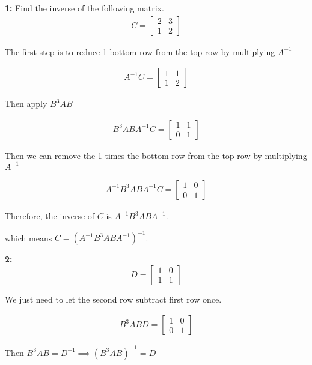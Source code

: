 \documentclass[11pt]{article}
\newenvironment{exercise}[1]
	{\noindent \textbf{#1:}}
	{\par \vspace{0.5\baselineskip}}
\begin{document}
\begin{exercise}{1}
	Find the inverse of the following matrix.
	\begin{align*}
		C = \begin{bmatrix}
			    2 & 3 \\
			    1 & 2
		    \end{bmatrix}
	\end{align*}

	The first step is to reduce 1 bottom row from the top row by multiplying \(A^{-1}\)
	
	\begin{align*}
		A^{-1}C = \begin{bmatrix}
			    1 & 1 \\
			    1 & 2
		    \end{bmatrix}
	\end{align*}

	Then apply \(B^{3}AB\)

	\begin{align*}
		B^{3}ABA^{-1}C = \begin{bmatrix}
			    1 & 1 \\
			    0 & 1
		    \end{bmatrix}
	\end{align*}

	Then we can remove the 1 times the bottom row from the top row by multiplying \(A^{-1}\)

	\begin{align*}
		A^{-1}B^{3}ABA^{-1}C = \begin{bmatrix}
			    1 & 0 \\
			    0 & 1
		    \end{bmatrix}
	\end{align*}

	Therefore, the inverse of $C$ is $A^{-1}B^{3}ABA^{-1}$.

	which means \(C=(A^{-1}B^{3}ABA^{-1})^{-1}\).

\end{exercise}

\begin{exercise}{2}
	\[
		D=\begin{bmatrix}
			1 & 0 \\
			1 & 1
		\end{bmatrix}
	\]

	We just need to let the second row subtract first row once.

	\begin{align*}
		B^{3}ABD = \begin{bmatrix}
			1 & 0 \\
			0 & 1
		\end{bmatrix}
	\end{align*}

	Then \(B^3AB=D^{-1}\implies (B^3AB)^{-1}=D\)
\end{exercise}
\end{document}
